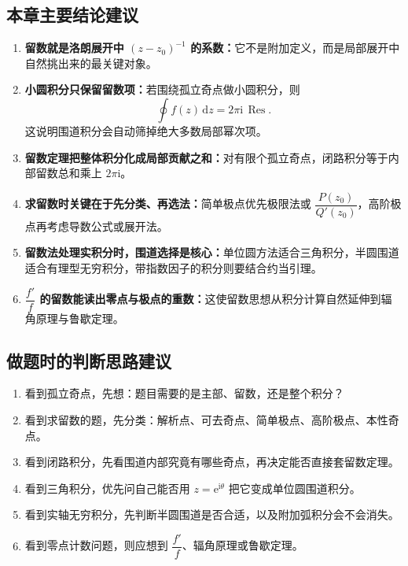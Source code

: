 \subsection*{本章主要结论建议}
\begin{zhongyao}[本章主要结论]
\raggedright
\begin{enumerate}
    \item \textbf{留数就是洛朗展开中 $(z-z_0)^{-1}$ 的系数：}它不是附加定义，而是局部展开中自然挑出来的最关键对象。
    \item \textbf{小圆积分只保留留数项：}若围绕孤立奇点做小圆积分，则
    \[
        \oint f(z)\,\mathrm{d}z = 2\pi \mathrm{i}\,\operatorname{Res}.
    \]
    这说明围道积分会自动筛掉绝大多数局部幂次项。
    \item \textbf{留数定理把整体积分化成局部贡献之和：}对有限个孤立奇点，闭路积分等于内部留数总和乘上 $2\pi \mathrm{i}$。
    \item \textbf{求留数时关键在于先分类、再选法：}简单极点优先极限法或 $\dfrac{P(z_0)}{Q'(z_0)}$，高阶极点再考虑导数公式或展开法。
    \item \textbf{留数法处理实积分时，围道选择是核心：}单位圆方法适合三角积分，半圆围道适合有理型无穷积分，带指数因子的积分则要结合约当引理。
    \item \textbf{$\dfrac{f'}{f}$ 的留数能读出零点与极点的重数：}这使留数思想从积分计算自然延伸到辐角原理与鲁歇定理。
\end{enumerate}
\end{zhongyao}

\subsection*{做题时的判断思路建议}
\begin{tishi}[做题时的判断思路]
\begin{enumerate}
    \item 看到孤立奇点，先想：题目需要的是主部、留数，还是整个积分？
    \item 看到求留数的题，先分类：解析点、可去奇点、简单极点、高阶极点、本性奇点。
    \item 看到闭路积分，先看围道内部究竟有哪些奇点，再决定能否直接套留数定理。
    \item 看到三角积分，优先问自己能否用 $z=\mathrm{e}^{\mathrm{i}\theta}$ 把它变成单位圆围道积分。
    \item 看到实轴无穷积分，先判断半圆围道是否合适，以及附加弧积分会不会消失。
    \item 看到零点计数问题，则应想到 $\dfrac{f'}{f}$、辐角原理或鲁歇定理。
\end{enumerate}
\end{tishi}

